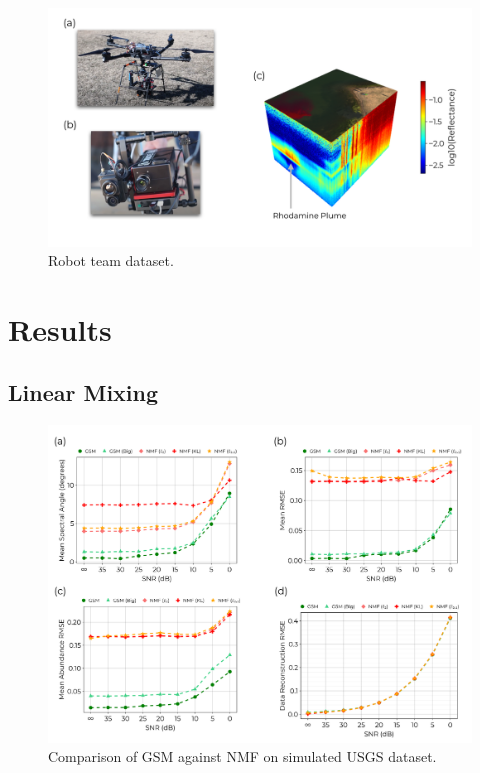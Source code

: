 \documentclass[remotesensing,article,submit,pdftex,moreauthors]{Definitions/mdpi}
\begin{document}
\begin{figure}[H]
\includegraphics[width=\columnwidth]{methods/robot-team/robot-team-overview.pdf}
\caption{Robot team dataset. \label{fig:robotteam-data}}
\end{figure}  



\section{Results}\label{sec:results}
\subsection{Linear Mixing}

\begin{figure}[H]
\includegraphics[width=\columnwidth]{results/usgs/fit-comparison.pdf}
\caption{Comparison of GSM against NMF on simulated USGS dataset. \label{fig:usgs-fits}}
\end{figure}  
\end{document}
